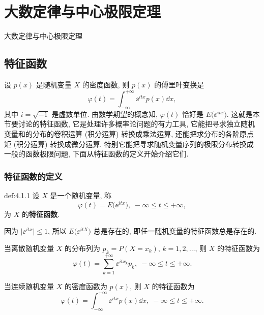 
\chapter{大数定律与中心极限定理}
大数定律与中心极限定理

\section{特征函数}

设 $ p (x) $ 是随机变量 $ X $ 的密度函数,
则 $ p (x) $ 的傅里叶变换是
\begin{equation*}
    \varphi (t) = \int_{-\infty}^{+\infty} \ee^{itx} p (x) \dd x,
\end{equation*}
其中 $ i = \sqrt{-1} $ 是虚数单位.
由数学期望的概念知,
$ \varphi (t) $ 恰好是 $ E \bigl( \ee^{itx} \bigr) $.
这就是本节要讨论的特征函数,
它是处理许多概率论问题的有力工具,
它能把寻求独立随机变量和的分布的卷积运算 (积分运算) 转换成乘法运算,
还能把求分布的各阶原点矩 (积分运算) 转换成微分运算.
特别它能把寻求随机变量序列的极限分布转换成一般的函数极限问题,
下面从特征函数的定义开始介绍它们.

\subsection{特征函数的定义}

\begin{definition}{}{def:4.1.1}
    设 $ X $ 是一个随机变量,
    称
    \begin{equation}\label{eq:4.1.1}
        \varphi (t) = E \bigl( \ee^{itx} \bigr), \; -\infty \leq t \leq +\infty,
    \end{equation}
    为 $ X $ 的\textbf{特征函数}.
\end{definition}

因为 $ \lvert \ee^{itx} \rvert \leq 1 $,
所以 $ E \bigl( \ee^{itX} \bigr) $ 总是存在的,
即任一随机变量的特征函数总是存在的.

当离散随机变量 $ X $ 的分布列为 $ p_k = P ( X = x_k ) $, $ k = 1,2,\dotsc $,
则 $ X $ 的特征函数为
\begin{equation}\label{eq:4.1.2}
    \varphi (t) = \sum_{k=1}^{+\infty} \ee^{itx_k} p_k, \; -\infty \leq t \leq +\infty.
\end{equation}

当连续随机变量 $ X $ 的密度函数为 $ p (x) $,
则 $ X $ 的特征函数为
\begin{equation}\label{ch9:eq:4.1.3}
    \varphi (t) = \int_{-\infty}^{+\infty} \ee^{itx} p (x) \dd x, \; -\infty \leq t \leq +\infty.
\end{equation}

